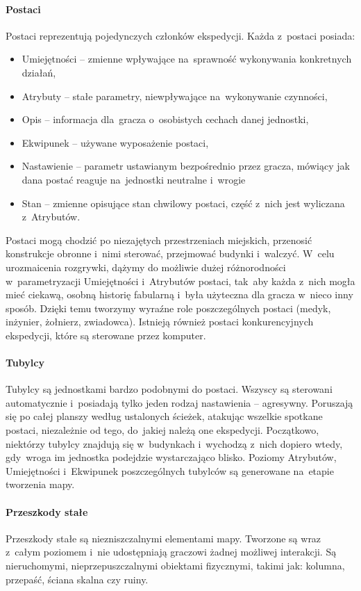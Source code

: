 \documentclass[licencjacka]{pracamgr}
\begin{document}
      \paragraph{Postaci}
	Postaci reprezentują pojedynczych członków ekspedycji. Każda z~postaci posiada:
	\begin{itemize}
	 \item Umiejętności -- zmienne wpływające na~sprawność wykonywania konkretnych działań,
	 \item Atrybuty -- stałe parametry, niewpływające na~wykonywanie czynności,
	 \item Opis -- informacja dla~gracza o~osobistych cechach danej jednostki,
	 \item Ekwipunek -- używane wyposażenie postaci,
	 \item Nastawienie -- parametr ustawianym bezpośrednio przez gracza, mówiący jak dana postać reaguje na~jednostki neutralne i~wrogie
	 \item Stan -- zmienne opisujące stan chwilowy postaci, część z~nich jest wyliczana z~Atrybutów.
	\end{itemize}
	Postaci mogą chodzić po niezajętych przestrzeniach miejskich, przenosić konstrukcje obronne i~nimi sterować,
	przejmować budynki i~walczyć. W~celu urozmaicenia rozgrywki, dążymy do możliwie dużej różnorodności w~parametryzacji
	Umiejętności i~Atrybutów postaci, tak~aby każda z~nich mogła mieć ciekawą, osobną historię fabularną i~była użyteczna
	dla gracza w~nieco inny sposób. Dzięki temu tworzymy wyraźne role poszczególnych postaci (medyk, inżynier, żołnierz, zwiadowca).
	Istnieją również postaci konkurencyjnych ekspedycji, które są sterowane przez komputer.
      \paragraph{Tubylcy}
	Tubylcy są jednostkami bardzo podobnymi do postaci. Wszyscy są sterowani automatycznie i~posiadają tylko jeden rodzaj
	nastawienia -- agresywny. Poruszają się po całej planszy według ustalonych ścieżek, atakując wszelkie spotkane postaci,
	niezależnie od tego, do~jakiej należą one ekspedycji. Początkowo, niektórzy tubylcy znajdują się w~budynkach i~wychodzą
	z~nich dopiero wtedy, gdy~wroga im jednostka podejdzie wystarczająco blisko. Poziomy Atrybutów, Umiejętności i~Ekwipunek poszczególnych
	tubylców są generowane na~etapie tworzenia mapy.
      \paragraph{Przeszkody stałe}
	Przeszkody stałe są niezniszczalnymi elementami mapy. Tworzone są wraz z~całym poziomem i~nie udostępniają graczowi żadnej
	możliwej interakcji. Są nieruchomymi, nieprzepuszczalnymi obiektami fizycznymi, takimi jak: kolumna, przepaść, ściana skalna czy ruiny.
\end{document}
